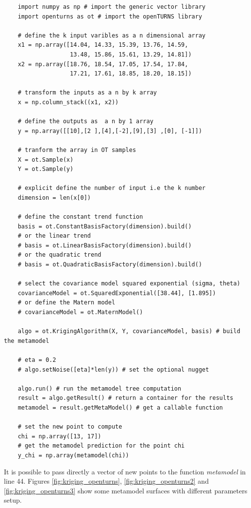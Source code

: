 \begin{verbatim}
	import numpy as np # import the generic vector library
	import openturns as ot # import the openTURNS library
	
	# define the k input varibles as a n dimensional array
	x1 = np.array([14.04, 14.33, 15.39, 13.76, 14.59,
				   13.48, 15.86, 15.61, 13.29, 14.81])
	x2 = np.array([18.76, 18.54, 17.05, 17.54, 17.84,
	               17.21, 17.61, 18.85, 18.20, 18.15])
	
	# transform the inputs as a n by k array
	x = np.column_stack((x1, x2))
	
	# define the outputs as  a n by 1 array
	y = np.array([[10],[2 ],[4],[-2],[9],[3] ,[0], [-1]])
	
	# tranform the array in OT samples
	X = ot.Sample(x)
	Y = ot.Sample(y)
	
	# explicit define the number of input i.e the k number
	dimension = len(x[0])
	
	# define the constant trend function
	basis = ot.ConstantBasisFactory(dimension).build()
	# or the linear trend
	# basis = ot.LinearBasisFactory(dimension).build()
	# or the quadratic trend
	# basis = ot.QuadraticBasisFactory(dimension).build()
	
	# select the covariance model squared exponential (sigma, theta)
	covarianceModel = ot.SquaredExponential([38.44], [1.895])
	# or define the Matern model
	# covarianceModel = ot.MaternModel()
	
	algo = ot.KrigingAlgorithm(X, Y, covarianceModel, basis) # build the metamodel
	
	# eta = 0.2
	# algo.setNoise([eta]*len(y)) # set the optional nugget
	
	algo.run() # run the metamodel tree computation
	result = algo.getResult() # return a container for the results
	metamodel = result.getMetaModel() # get a callable function
	
	# set the new point to compute
	chi = np.array([13, 17])
	# get the metamodel prediction for the point chi
	y_chi = np.array(metamodel(chi))
\end{verbatim}

\newpage

It is possible to pass directly a vector of new points to the function \textit{metamodel} in line 44. Figures \ref{fig:kriging_openturns}, \ref{fig:kriging_openturns2} and \ref{fig:kriging_openturns3} show some metamodel surfaces with different parameters setup.

